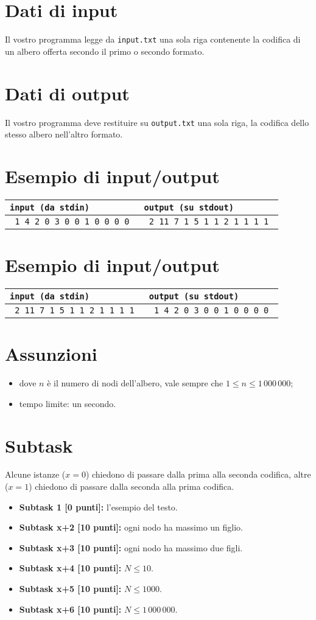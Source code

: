 \documentclass[a4paper,11pt]{article}
\newcommand{\file}[1]{\texttt{#1}}
\newcommand{\esempio}[2]{
\noindent\begin{minipage}{\textwidth}
\begin{tabular}{|p{8cm}|p{8cm}|}
	\hline
      \textbf{\file{input (da stdin)}} & \textbf{\file{output (su stdout)}}\\
	\hline
	\tt \small #1 &
	\tt \small #2 \\
	\hline
\end{tabular}
\end{minipage}
}
\begin{document}
\section*{Dati di input}

Il vostro programma legge da \verb'input.txt' una sola riga contenente la codifica di un albero offerta secondo il primo o secondo formato.

\section*{Dati di output}

Il vostro programma deve restituire su \verb'output.txt' una sola riga,
la codifica dello stesso albero nell'altro formato.

\section*{Esempio di input/output}
\esempio{
1 4 2 0 3 0 0 1 0 0 0 0
}{
2 11 7 1 5 1 1 2 1 1 1 1
}

\section*{Esempio di input/output}
\esempio{
2 11 7 1 5 1 1 2 1 1 1 1
}{
1 4 2 0 3 0 0 1 0 0 0 0
}

\section*{Assunzioni}
\begin{itemize}[nolistsep, noitemsep]
\item dove $n$ \`e il numero di nodi dell'albero,
      vale sempre che $1 \le n \le 1\,000\,000 $;
\item tempo limite: un secondo.
\end{itemize}

\section*{Subtask}
Alcune istanze ($x=0$) chiedono di passare dalla prima alla seconda codifica,
altre ($x=1$) chiedono di passare dalla seconda alla prima codifica.
\begin{itemize}
\item \textbf{Subtask 1 [0 punti]:} l'esempio del testo.
\item \textbf{Subtask x+2 [10 punti]:} ogni nodo ha massimo un figlio.
\item \textbf{Subtask x+3 [10 punti]:} ogni nodo ha massimo due figli.
\item \textbf{Subtask x+4 [10 punti]:} $N \le 10$.
\item \textbf{Subtask x+5 [10 punti]:} $N \le 1000$.
\item \textbf{Subtask x+6 [10 punti]:} $N \le 1\,000\,000$.
\end{itemize}
\end{document}
